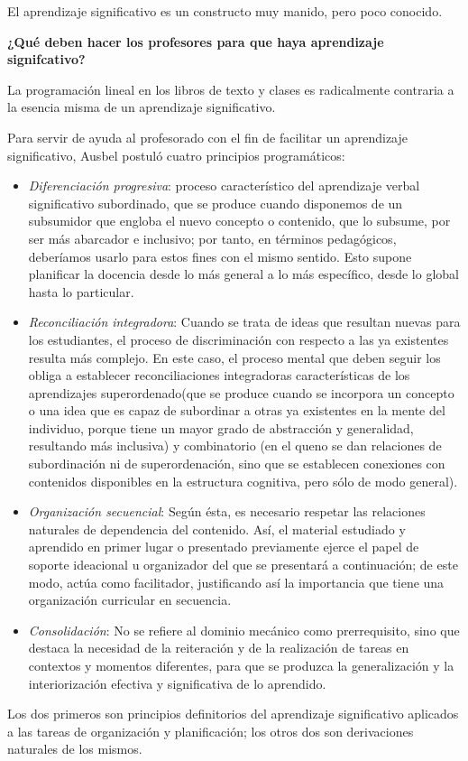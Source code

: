 \documentclass[12pt]{report}
\newcounter{it}
\theoremstyle{largebreak}
\begin{document}
    El aprendizaje significativo es un constructo muy manido, pero poco conocido.

    \begin{center}
        \textbf{¿Qué deben hacer los profesores para que haya aprendizaje signifcativo?}
    \end{center}

    La programación lineal en los libros de texto y clases es radicalmente contraria a la esencia misma de un aprendizaje significativo.

    Para servir de ayuda al profesorado con el fin de facilitar un aprendizaje significativo, Ausbel postuló cuatro principios programáticos:
    \begin{itemize}
        \item \textit{Diferenciación progresiva}: proceso característico del aprendizaje verbal
        significativo subordinado, que se produce cuando disponemos de un subsumidor que
        engloba el nuevo concepto o contenido, que lo subsume, por ser más abarcador e
        inclusivo; por tanto, en términos pedagógicos, deberíamos usarlo para estos fines con
        el mismo sentido. Esto supone planificar la docencia desde lo más general a lo más
        específico, desde lo global hasta lo particular.
        \item \textit{Reconciliación integradora}: Cuando se trata de ideas que resultan nuevas para los estudiantes, el proceso de
        discriminación con respecto a las ya existentes resulta más complejo. En este caso, el
        proceso mental que deben seguir los obliga a establecer reconciliaciones integradoras
        características de los aprendizajes superordenado(que se produce cuando se
        incorpora un concepto o una idea que es capaz de subordinar a otras ya existentes en
        la mente del individuo, porque tiene un mayor grado de abstracción y generalidad,
        resultando más inclusiva) y combinatorio (en el queno se dan relaciones de
        subordinación ni de superordenación, sino que se establecen conexiones con
        contenidos disponibles en la estructura cognitiva, pero sólo de modo general).
        \item \textit{Organización secuencial}: Según ésta, es necesario respetar las relaciones naturales de
        dependencia del contenido. Así, el material estudiado y aprendido en primer lugar o
        presentado previamente ejerce el papel de soporte ideacional u organizador del que se
        presentará a continuación; de este modo, actúa como facilitador, justificando así la
        importancia que tiene una organización curricular en secuencia.
        \item \textit{Consolidación}: No se refiere al
        dominio mecánico como prerrequisito, sino que destaca la necesidad de la reiteración
        y de la realización de tareas en contextos y momentos diferentes, para que se
        produzca la generalización y la interiorización efectiva y significativa de lo
        aprendido.
    \end{itemize}
    Los dos primeros son principios definitorios del aprendizaje significativo aplicados a las tareas de organización y planificación; los otros dos son derivaciones naturales de los
    mismos.
\end{document}
